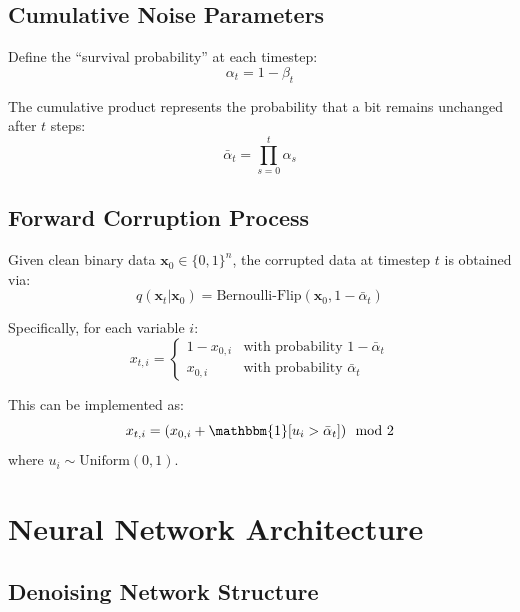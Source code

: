 \documentclass[11pt,a4paper]{article}
\newcommand{\vx}{\mathbf{x}}
\begin{document}
\subsection{Cumulative Noise Parameters}

Define the ``survival probability'' at each timestep:
\begin{equation}
    \alpha_t = 1 - \beta_t
\end{equation}

The cumulative product represents the probability that a bit remains unchanged after $t$ steps:
\begin{equation}
    \bar{\alpha}_t = \prod_{s=0}^{t} \alpha_s
\end{equation}

\subsection{Forward Corruption Process}

Given clean binary data $\vx_0 \in \{0,1\}^n$, the corrupted data at timestep $t$ is obtained via:
\begin{equation}
    q(\vx_t | \vx_0) = \text{Bernoulli-Flip}(\vx_0, 1 - \bar{\alpha}_t)
\end{equation}

Specifically, for each variable $i$:
\begin{equation}
    x_{t,i} = \begin{cases}
        1 - x_{0,i} & \text{with probability } 1 - \bar{\alpha}_t \\
        x_{0,i} & \text{with probability } \bar{\alpha}_t
    \end{cases}
\end{equation}

This can be implemented as:
\begin{equation}
    x_{t,i} = (x_{0,i} + \mathbbm{1}[u_i > \bar{\alpha}_t]) \mod 2
\end{equation}
where $u_i \sim \text{Uniform}(0,1)$.

\section{Neural Network Architecture}

\subsection{Denoising Network Structure}
\end{document}
